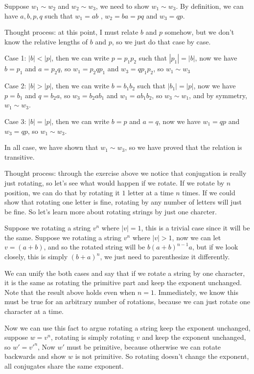 \documentclass{article}
\begin{document}
Suppose $ w_1 \sim w_2 $ and $ w_2 \sim w_3 $, we need to show $ w_1 \sim w_3 $. By definition, we can have $ a, b, p, q $ such that $ w_1 = ab $ , $ w_2 = ba = pq $ and $ w_3 = qp $.

Thought process: at this point, I must relate $ b $ and $ p $ somehow, but we don't know the relative lengths of $ b $ and $ p $, so we just do that case by case.

Case 1: $ |b| < |p| $, then we can write $ p = p_1 p_2 $ such that $ |p_1| = |b| $, now we have $ b = p_1 $ and $ a = p_2 q $, so $ w_1 = p_2 q p_1  $ and $ w_3 = q p_1 p_2 $, so $ w_1 \sim w_3 $

Case 2: $ |b| > |p| $, then we can write $ b = b_1 b_2 $ such that $ |b_1| = |p| $, now we have $ p = b_1 $ and $ q = b_2 a $, so $ w_3 = b_2 a b_1 $ and $ w_1 = a b_1 b_2 $, so $ w_3 \sim w_1 $, and by symmetry, $ w_1 \sim w_3 $.

Case 3: $ |b| = |p| $, then we can write $ b = p $ and $ a = q $, now we have $ w_1 = q p $ and $ w_3 = q p $, so $ w_1 \sim w_3 $.

In all case, we have shown that $ w_1 \sim w_3 $, so we have proved that the relation is transitive.

Thought process: through the exercise above we notice that conjugation is really just rotating, so let's see what would happen if we rotate. If we rotate by $ n $ position, we can do that by rotating it $ 1 $ letter at a time $ n $ times. If we could show that rotating one letter is fine, rotating by any number of letters will just be fine. So let's learn more about rotating strings by just one charcter.

Suppose we rotating a string $ v^n $ where $ |v| = 1 $, this is a trivial case since it will be the same.
Suppose we rotating a string $ v^n $ where $ |v| > 1 $, now we can let $ v = (a+b) $, and so the rotated string will be $ b(a+b)^{n-1}a $, but if we look closely, this is simply $ (b+a)^n $, we just need to parenthesize it differently. 

We can unify the both cases and say that if we rotate a string by one character, it is the same as rotating the primitive part and keep the exponent unchanged. Note that the result above holds even when $ n = 1 $. Immediately, we know this must be true for an arbitrary number of rotations, because we can just rotate one character at a time.

Now we can use this fact to argue rotating a string keep the exponent unchanged, suppose $ w = v^n $, rotating is simply rotating $ v $ and keep the exponent unchanged, so $ w' = v'^n $, Now $ w' $ must be primitive, because otherwise we can rotate backwards and show $ w $ is not primitive. So rotating doesn't change the exponent, all conjugates share the same exponent.
\end{document}
